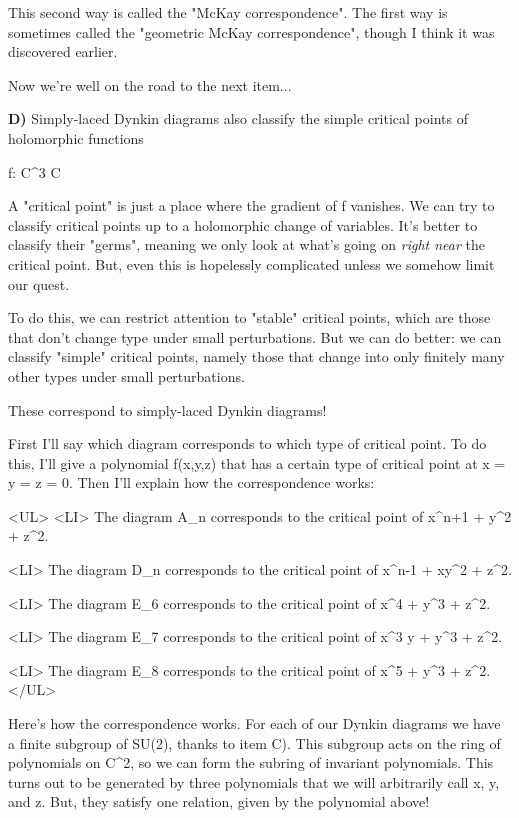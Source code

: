 This second way is called the "McKay correspondence".  The first way
is sometimes called the "geometric McKay correspondence", though I think
it was discovered earlier.

Now we're well on the road to the next item...

\textbf{D)} 
Simply-laced Dynkin diagrams also classify the simple critical points
of holomorphic functions 

f: C^{3} \to  C

A "critical point" is just a place where the gradient of f vanishes.
We can try to classify critical points up to a holomorphic change of 
variables.  It's better to classify their "germs", meaning we only 
look at what's going on \emph{right near} the critical point.   But, even 
this is hopelessly complicated unless we somehow limit our quest.

To do this, we can restrict attention to "stable" critical points, 
which are those that don't change type under small perturbations.  
But we can do better: we can classify "simple" critical points, 
namely those that change into only finitely many other types under 
small perturbations.

These correspond to simply-laced Dynkin diagrams!

First I'll say which diagram corresponds to which type of critical
point.  To do this, I'll give a polynomial f(x,y,z) that has a certain 
type of critical point at x = y = z = 0.  Then I'll explain how
the correspondence works:

<UL>
<LI>
The diagram A_{n} corresponds to the critical point of x^{n+1} + y^{2} + z^{2}.

<LI>
The diagram D_{n} corresponds to the critical point of x^{n-1} + xy^{2} + z^{2}.

<LI>
The diagram E_{6} corresponds to the critical point of x^{4} + y^{3} + z^{2}.

<LI>
The diagram E_{7} corresponds to the critical point of x^{3} y + y^{3} + z^{2}.

<LI>
The diagram E_{8} corresponds to the critical point of x^{5} + y^{3} + z^{2}.
</UL>

Here's how the correspondence works.  For each of our Dynkin diagrams
we have a finite subgroup of SU(2), thanks to item C).  This subgroup 
acts on the ring of polynomials on C^{2}, so we can form the subring of 
invariant polynomials.  This turns out to be generated by three polynomials 
that we will arbitrarily call x, y, and z.  But, they satisfy one relation, 
given by the polynomial above!

